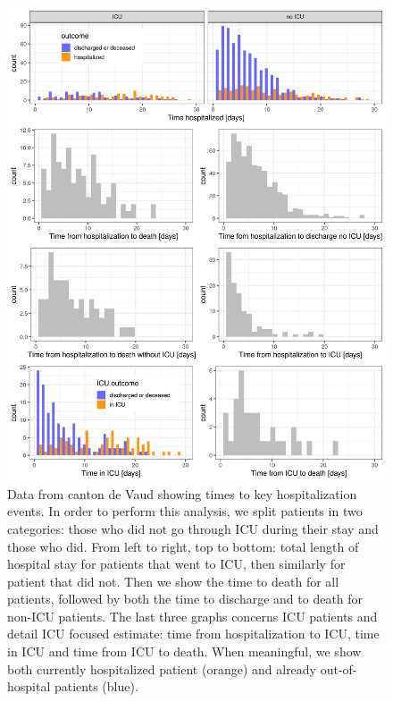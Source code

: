 \begin{figure}[!htb]
    \centering
    \includegraphics[width=.8\textwidth]{fig_covid-switzerland-npi/fig_supp/VD_times.png}
    \caption[Key data of hospitalization events in canton de Vaud]{Data from canton de Vaud showing times to key hospitalization events. In order to perform this analysis, we split patients in two categories: those who did not go through ICU during their stay and those who did. From left to right, top to bottom: total length of hospital stay for patients that went to ICU, then similarly for patient that did not. Then we show the time to death for all patients, followed by both the time to discharge and to death for non-ICU patients. The last three graphs concerns ICU patients and detail ICU focused estimate: time from hospitalization to ICU, time in ICU and time from ICU to death. When meaningful, we show both currently hospitalized patient (orange) and already out-of-hospital patients (blue).}
    \label{fig:vdtimes}
\end{figure}

